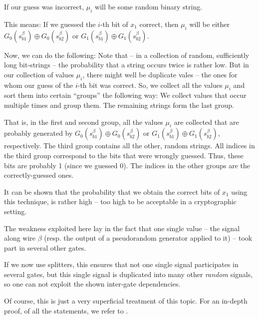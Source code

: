 If our guess was incorrect, $\mu_i$ will be some random binary string.

This means: If we guessed the $i$-th bit of $x_1$ correct, then $\mu_i$ will be either $G_0(s^\beta_{b1})\oplus G_0(s^\beta_{b2})$ or $G_1(s^\beta_{b1})\oplus G_1(s^\beta_{b2})$. 

Now, we can do the following: Note that -- in a collection of random, sufficiently long bit-strings -- the probability that a string occurs twice is rather low. But in our collection of values $\mu_i$, there might well be duplicate vales -- the ones for whom our guess of the $i$-th bit was correct. So, we collect all the values $\mu_i$ and sort them into certain ``groups'' the following way: We collect values that occur multiple times and group them. The remaining strings form the last group.

That is, in the first and second group, all the values $\mu_i$ are collected that are probably generated by $G_0(s^\beta_{b1})\oplus G_0(s^\beta_{b2})$ or $G_1(s^\beta_{b1})\oplus G_1(s^\beta_{b2})$, respectively. The third group contains all the other, random strings. All indices in the third group correspond to the bits that were wrongly guessed. Thus, these bits are probably 1 (since we guessed 0). The indices in the other groups are the correctly-guessed ones.

It can be shown that the probability that we obtain the correct bits of $x_1$ using this technique, is rather high -- too high to be acceptable in a cryptographic setting.

The weakness exploited here lay in the fact that one single value -- the signal along wire $\beta$ (resp. the output of a pseudorandom generator applied to it) -- took part in several other gates.

If we now use splitters, this ensures that not one single signal participates in several gates, but this single signal is duplicated into many other \emph{random} signals, so one can not exploit the shown inter-gate dependencies.

Of course, this is just a very superficial treatment of this topic. For an in-depth proof, of all the statements, we refer to \cite{Xu:2004:MAS:1023552}.

